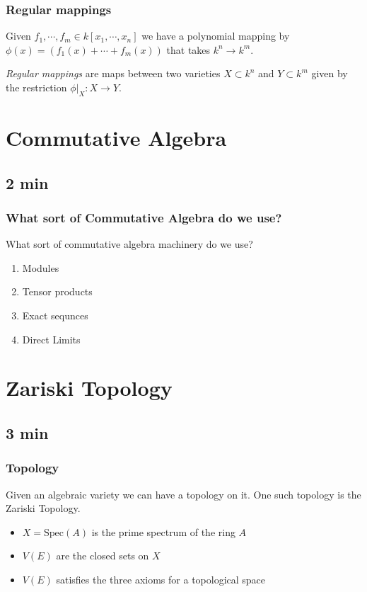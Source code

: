 \documentclass[pdf]{beamer}
\begin{document}
\begin{frame}
    \frametitle{Regular mappings}

    Given $f_1, \cdots, f_m \in k[x_1, \cdots, x_n]$ we have a polynomial mapping by $\phi(x) = (f_1(x) + \cdots + f_m(x))$ that takes $k^n \rightarrow k^m$.  

    \textit{Regular mappings} are maps between two varieties $X \subset k^n$ and $Y \subset k^m$ given by the restriction $\phi|_{X}: X \rightarrow Y$. 

\end{frame}

\section{Commutative Algebra}
\subsection{2 min}

\begin{frame}
    \frametitle{What sort of Commutative Algebra do we use?}
    What sort of commutative algebra machinery do we use?
    \begin{enumerate}
        \item Modules
        \item Tensor products
        \item Exact sequnces
        \item Direct Limits
    \end{enumerate}
\end{frame}

\section{Zariski Topology}
\subsection{3 min}

\begin{frame}
    \frametitle{Topology}
    Given an algebraic variety we can have a topology on it. One such topology is the Zariski Topology. 
    \begin{itemize}
        \item $X = \text{Spec}(A)$ is the prime spectrum of the ring $A$
        \item $V(E)$ are the closed sets on $X$
        \item $V(E)$ satisfies the three axioms for a topological space 
    \end{itemize}
\end{frame}
\end{document}
